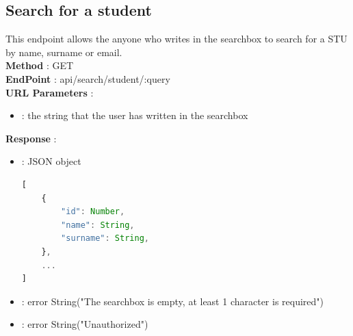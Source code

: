 \subsection*{Search for a student}
This endpoint allows the anyone who writes in the searchbox to search for a STU by name, surname or email.\\
\textbf{Method} : GET \\
\textbf{EndPoint} : api/search/student/:query \\
\textbf{URL Parameters} :
\begin{itemize}
    \item {} : the string that the user has written in the searchbox\\
\end{itemize}
\textbf{Response} :
\begin{itemize}
    \item {} : JSON object
          \begin{lstlisting}[language=JavaScript, label={lst:jscode}, basicstyle=\ttfamily]
[
    {
        "id": Number,
        "name": String,
        "surname": String,
    },
    ...
]
            \end{lstlisting}
    \item {} : error String("The searchbox is empty, at least 1 character is required")
    \item {} : error String("Unauthorized")
\end{itemize}

